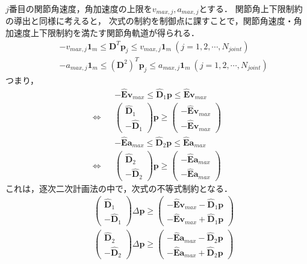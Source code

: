 $j$番目の関節角速度，角加速度の上限を$v_{max,j}, a_{max,j}$とする．
関節角上下限制約の導出と同様に考えると，
次式の制約を制御点に課すことで，関節角速度・角加速度上下限制約を満たす関節角軌道が得られる．
\begin{eqnarray}
  &&- v_{max,j} \bm{1}_m \leq \bm{D}^T \bm{p}_j \leq v_{max,j} \bm{1}_m \ (j = 1,2,\cdots,N_{\mathit{joint}}) \\
  &&- a_{max,j} \bm{1}_m \leq (\bm{D}^2)^T \bm{p}_j \leq a_{max,j} \bm{1}_m \ (j = 1,2,\cdots,N_{\mathit{joint}})
\end{eqnarray}
つまり，
\begin{eqnarray}
  &&- \bm{\hat{E}} \bm{v}_{max} \leq \bm{\hat{D}}_1 \bm{p} \leq \bm{\hat{E}} \bm{v}_{max} \label{eq:bspline-theta-dot-constraint} \\
  \Leftrightarrow&&
  \begin{pmatrix} \bm{\hat{D}}_1 \\ - \bm{\hat{D}}_1 \end{pmatrix} \bm{p} \geq \begin{pmatrix} - \bm{\hat{E}} \bm{v}_{max} \\ - \bm{\hat{E}} \bm{v}_{max} \end{pmatrix} \\
  &&- \bm{\hat{E}} \bm{a}_{max} \leq \bm{\hat{D}}_2 \bm{p} \leq \bm{\hat{E}} \bm{a}_{max} \label{eq:bspline-theta-ddot-constraint} \\
  \Leftrightarrow&&
  \begin{pmatrix} \bm{\hat{D}}_2 \\ - \bm{\hat{D}}_2 \end{pmatrix} \bm{p} \geq \begin{pmatrix} - \bm{\hat{E}} \bm{a}_{max} \\ - \bm{\hat{E}} \bm{a}_{max} \end{pmatrix}
\end{eqnarray}
これは，逐次二次計画法の中で，次式の不等式制約となる．
\begin{eqnarray}
  &&\begin{pmatrix} \bm{\hat{D}}_1 \\ - \bm{\hat{D}}_1 \end{pmatrix} \Delta \bm{p} \geq \begin{pmatrix} - \bm{\hat{E}} \bm{v}_{max} - \bm{\hat{D}}_1 \bm{p} \\ - \bm{\hat{E}} \bm{v}_{max} + \bm{\hat{D}}_1 \bm{p} \end{pmatrix} \\
  &&\begin{pmatrix} \bm{\hat{D}}_2 \\ - \bm{\hat{D}}_2 \end{pmatrix} \Delta \bm{p} \geq \begin{pmatrix} - \bm{\hat{E}} \bm{a}_{max} - \bm{\hat{D}}_2 \bm{p} \\ - \bm{\hat{E}} \bm{a}_{max} + \bm{\hat{D}}_2 \bm{p} \end{pmatrix}
\end{eqnarray}

